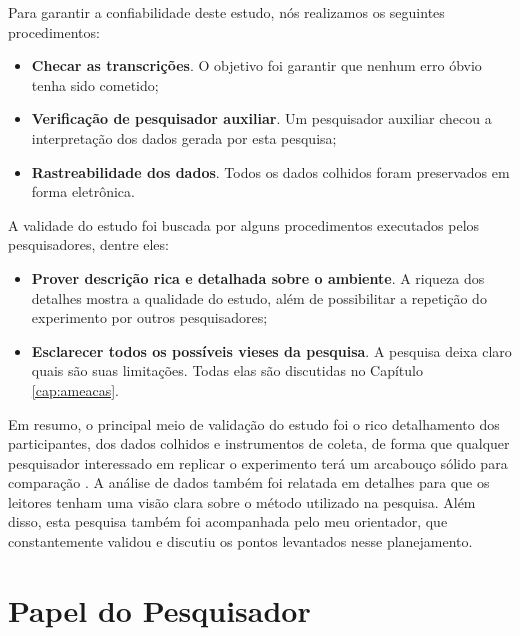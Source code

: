 Para garantir a confiabilidade deste estudo, nós realizamos os
seguintes procedimentos:

\begin{itemize}
	\item \textbf{Checar as transcrições}. O objetivo foi garantir que nenhum erro
	óbvio tenha sido cometido;

	\item \textbf{Verificação de pesquisador auxiliar}. Um pesquisador auxiliar
	checou a interpretação dos dados gerada por esta pesquisa;
	
	\item \textbf{Rastreabilidade dos dados}. Todos os dados colhidos foram
	preservados em forma eletrônica.

\end{itemize}

A validade do estudo foi buscada por alguns procedimentos executados pelos
pesquisadores, dentre eles:

\begin{itemize}

	\item \textbf{Prover descrição rica e detalhada sobre o ambiente}. A riqueza
	dos detalhes mostra a qualidade do estudo, além de possibilitar a repetição do
	experimento por outros pesquisadores;

	\item \textbf{Esclarecer todos os possíveis vieses da pesquisa}. A pesquisa
	deixa claro quais são suas limitações. Todas elas são discutidas no Capítulo
	\ref{cap:ameacas}.

\end{itemize}

Em resumo, o principal meio de validação do estudo foi o rico detalhamento dos
participantes, dos dados colhidos e instrumentos de coleta, de forma
que qualquer pesquisador interessado em replicar o experimento terá um
arcabouço sólido para comparação \cite{merriam-1998}. A análise de
dados também foi relatada em detalhes para que os leitores tenham uma visão
clara sobre o método utilizado na pesquisa. 
Além disso, esta pesquisa também foi acompanhada pelo meu orientador,
que constantemente validou e discutiu os pontos levantados nesse planejamento.

\section{Papel do Pesquisador}
\label{sec:planejamento-papel}

